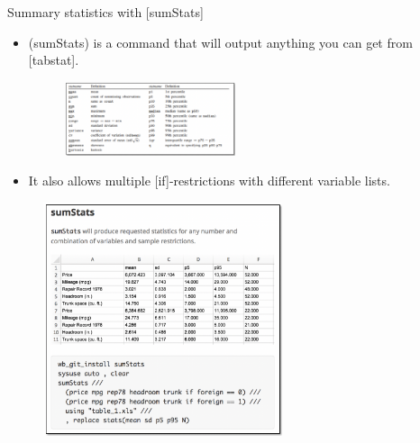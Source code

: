 \documentclass[aspectratio=169]{beamer}
\begin{document}
\begin{frame}{Summary statistics with [sumStats]}
	\begin{multicols}{2}	
		
		\begin{itemize}[<default overlay specification>]
			\item<1> (sumStats) is a command that will output anything you can get from [tabstat].
			
			\begin{figure}
				\centering
				\includegraphics[width=50mm]{img/Table4}
			\end{figure}
			
			\item<1> It also allows multiple [if]-restrictions with different variable lists.
		\end{itemize}
		
		\begin{figure}
			\centering
			\includegraphics[width=70mm]{img/Table5}
		\end{figure}
		
	\end{multicols}
\end{frame}
\end{document}
